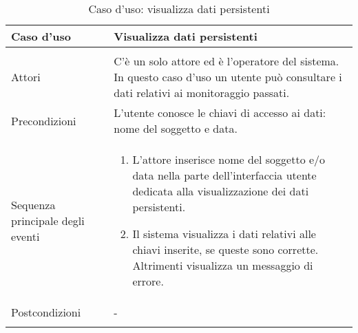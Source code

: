    \begin{table}
\centering
  \begin{tabular}{p{} p{}}
  \\
  \hline
      Caso d'uso 
    & 
      Visualizza dati persistenti
  \\
  \hline\\
      Attori
    &
      C'\`e un solo attore ed \`e l'operatore del sistema. In questo caso d'uso un utente pu\`o consultare i dati relativi ai monitoraggio passati. 
  \\
      Precondizioni
    &
      L'utente conosce le chiavi di accesso ai dati: nome del soggetto e data.
  \\
      Sequenza principale degli eventi
    &
      \begin{enumerate}
	\item 
	  L'attore inserisce nome del soggetto e/o data nella parte dell'interfaccia utente dedicata alla visualizzazione dei dati persistenti.
	\item
	  Il sistema visualizza i dati relativi alle chiavi inserite, se queste sono corrette. Altrimenti visualizza un messaggio di errore.
      \end{enumerate}      
  \\
      Postcondizioni
    &
      -
  \\\\
  \hline
  \end{tabular}
   \caption{Caso d'uso: visualizza dati persistenti}
   \label{casoDUsoVisualizzaDatiPersistenti}
   \end{table}



